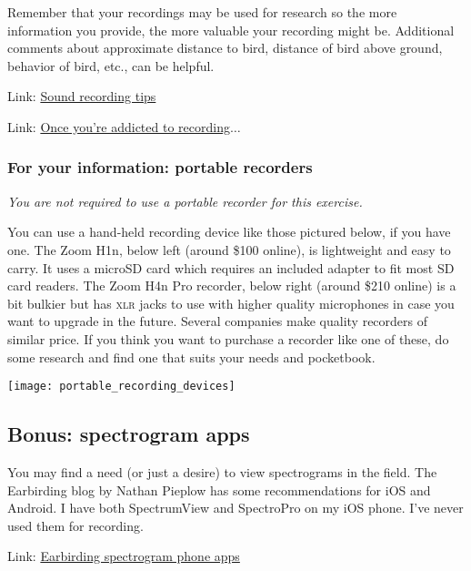 \documentclass[12pt]{article}
\begin{document}
Remember that your recordings may be used for research so the more information you provide, the more valuable your recording might be. Additional comments about approximate distance to bird, distance of bird above ground, behavior of bird, etc., can be helpful.

Link: \href{https://support.ebird.org/en/support/solutions/articles/48001064298-sound-recording-tips}{Sound recording tips}

Link: \href{https://www.macaulaylibrary.org/resources/audio-recording-gear/}{Once you're addicted to recording$\dots$}

\subsubsection*{For your information: portable recorders}

\emph{You are not required to use a portable recorder for this exercise.}

You can use a hand-held recording device like those pictured below, if you have one. The Zoom H1n, below left (around \$100 online), is lightweight and easy to carry. It uses a microSD card which requires an included adapter to fit most SD card readers. The Zoom H4n Pro recorder, below right (around \$210 online) is a bit bulkier but has \textsc{xlr} jacks to use with higher quality microphones in case you want to upgrade in the future. Several companies make quality recorders of similar price. If you think you want to purchase a recorder like one of these, do some research and find one that suits your needs and pocketbook.

\begin{center}
\texttt{[image: portable\_recording\_devices]}
\end{center}

\subsection*{Bonus: spectrogram apps}

You may find a need (or just a desire) to view spectrograms in the field. The Earbirding blog by Nathan Pieplow has some recommendations for iOS and Android. I have both SpectrumView and SpectroPro on my iOS phone. I've never used them for recording.

Link: \href{https://earbirding.com/blog/archives/5394}{Earbirding spectrogram phone apps}
\end{document}
